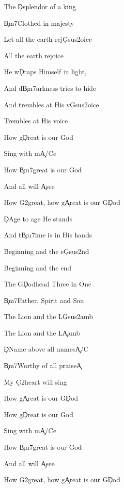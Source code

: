 \documentclass[9pt]{extarticle}
\begin{document}
\bsong

\bv
The \c{D}splendor of a king

\c{Bm7}Clothed in majesty

Let all the earth rej\c{Gsus2}oice

All the earth rejoice
\ev

\bv
He w\c{D}raps Himself in light,

And d\c{Bm7}arkness tries to hide

And trembles at His v\c{Gsus2}oice

Trembles at His voice
\ev

\bc
How g\c{D}reat is our God

Sing with m\c{A/C\s }e

How \c{Bm7}great is our God

And all will \c{A}see

How \c{G2}great, how g\c{A}reat is our G\c{D}od
\ec

\bv
\c{D}Age to age He stands

And t\c{Bm7}ime is in His hands

Beginning and the e\c{Gsus2}nd

Beginning and the end
\ev

\bv
The G\c{D}odhead Three in One

\c{Bm7}Father, Spirit and Son

The Lion and the L\c{Gsus2}amb

The Lion and the L\c{A}amb
\ev


\bb[2]
\c{D}Name above all names\c{A/C\s }

\c{Bm7}Worthy of all praise\c{A}

My \c{G2}heart will sing

How g\c{A}reat is our G\c{D}od
\eb


\bo
How g\c{D}reat is our God

Sing with m\c{A/C\s }e

How \c{Bm7}great is our God

And all will \c{A}see

How \c{G2}great, how g\c{A}reat is our G\c{D}od
\eo

\esong
\end{document}
